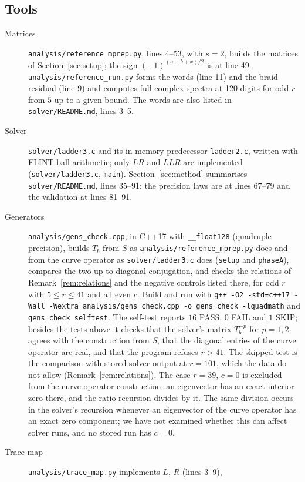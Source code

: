 \documentclass[11pt]{amsart}
\theoremstyle{definition}
\theoremstyle{remark}
\begin{document}
\subsection{Tools}\label{app:tools}
\begin{description}
\item[Matrices] \texttt{analysis/reference\_mprep.py}, lines 4--53, with $s = 2$,
builds the matrices of Section~\ref{sec:setup}; the sign $(-1)^{(a+b+x)/2}$ is at
line 49. \texttt{analysis/reference\_run.py} forms the words (line 11) and the braid
residual (line 9) and computes full complex spectra at 120 digits for odd $r$ from
$5$ up to a given bound. The words are also listed in \texttt{solver/README.md},
lines 3--5.
\item[Solver] \texttt{solver/ladder3.c} and its in-memory predecessor
\texttt{ladder2.c}, written with FLINT ball arithmetic; only $LR$ and $LLR$ are
implemented (\texttt{solver/ladder3.c}, \texttt{main}). Section~\ref{sec:method}
summarises \texttt{solver/README.md}, lines 35--91; the precision laws are at
lines 67--79 and the validation at lines 81--91.
\item[Generators] \texttt{analysis/gens\_check.cpp}, in C++17 with
\texttt{\_\_float128} (quadruple precision), builds $T_b$ from $S$ as
\texttt{analysis/reference\_mprep.py} does and from the curve operator as
\texttt{solver/ladder3.c} does (\texttt{setup} and \texttt{phaseA}), compares the
two up to diagonal conjugation, and checks the relations of
Remark~\ref{rem:relations} and the negative controls listed there, for odd $r$ with
$5 \le r \le 41$ and all even $c$. Build and run with
\texttt{g++ -O2 -std=c++17 -Wall -Wextra analysis/gens\_check.cpp -o gens\_check
-lquadmath} and \texttt{gens\_check selftest}. The self-test reports $16$ PASS,
$0$ FAIL and $1$ SKIP; besides the tests above it checks that the solver's matrix
$T_b^{-p}$ for $p = 1, 2$ agrees with the construction from $S$, that the diagonal
entries of the curve operator are real, and that the program refuses $r > 41$. The skipped test is the comparison with stored solver output
at $r = 101$, which the data do not allow (Remark~\ref{rem:relations}). The case
$r = 39$, $c = 0$ is excluded from the curve operator construction: an eigenvector
has an exact interior zero there, and the ratio recursion divides by it. The same
division occurs in the solver's recursion whenever an eigenvector of the curve
operator has an exact zero component; we have not examined whether this can affect
solver runs, and no stored run has $c = 0$.
\item[Trace map] \texttt{analysis/trace\_map.py} implements $L$, $R$ (lines 3--9),

\end{description}
\end{document}
